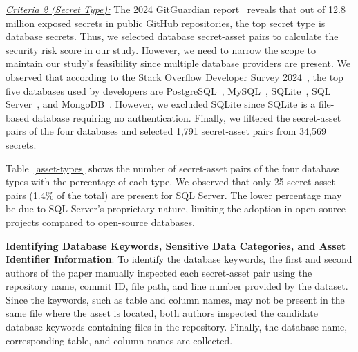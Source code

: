 \textit{\uline{Criteria 2 (Secret Type):}} The 2024 GitGuardian report~\cite{gitguardian-secret-sprawl} reveals that out of 12.8 million exposed secrets in public GitHub repositories, the top secret type is database secrets. Thus, we selected database secret-asset pairs to calculate the security risk score in our study. However, we need to narrow the scope to maintain our study's feasibility since multiple database providers are present. We observed that according to the Stack Overflow Developer Survey 2024~\cite{SOdevelopersurvey2024}, the top five databases used by developers are PostgreSQL~\cite{postgresql}, MySQL~\cite{mysql}, SQLite~\cite{sqlite}, SQL Server~\cite{sqlserver}, and MongoDB~\cite{mongodb}. However, we excluded SQLite since SQLite is a file-based database requiring no authentication. Finally, we filtered the secret-asset pairs of the four databases and selected 1,791 secret-asset pairs from 34,569 secrets.

Table~\ref{asset-types} shows the number of secret-asset pairs of the four database types with the percentage of each type. We observed that only 25 secret-asset pairs (1.4\% of the total) are present for SQL Server. The lower percentage may be due to SQL Server's proprietary nature, limiting the adoption in open-source projects compared to open-source databases.



\textbf{Identifying Database Keywords, Sensitive Data Categories, and Asset Identifier Information}: To identify the database keywords, the first and second authors of the paper manually inspected each secret-asset pair using the repository name, commit ID, file path, and line number provided by the dataset. Since the keywords, such as table and column names, may not be present in the same file where the asset is located, both authors inspected the candidate database keywords containing files in the repository. Finally, the database name, corresponding table, and column names are collected.

